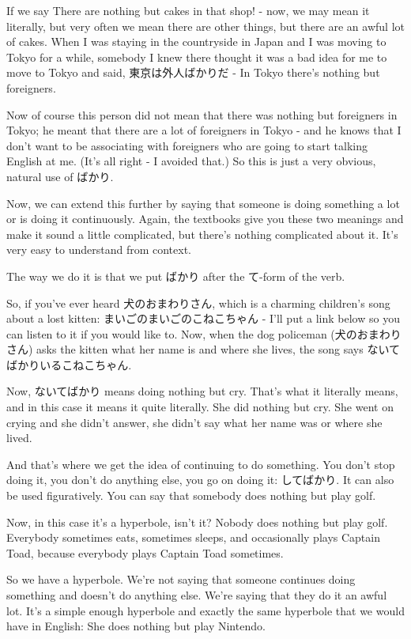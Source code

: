 If we say There are nothing but cakes in that shop! - now, we may mean it literally, but very often we mean there are other things, but there are an awful lot of cakes. When I was staying in the countryside in Japan and I was moving to Tokyo for a while, somebody I knew there thought it was a bad idea for me to move to Tokyo and said, 東京は外人ばかりだ - In Tokyo there's nothing but foreigners.

Now of course this person did not mean that there was nothing but foreigners in Tokyo; he meant that there are a lot of foreigners in Tokyo - and he knows that I don't want to be associating with foreigners who are going to start talking English at me. (It's all right - I avoided that.) So this is just a very obvious, natural use of ばかり.

Now, we can extend this further by saying that someone is doing something a lot or is doing it continuously. Again, the textbooks give you these two meanings and make it sound a little complicated, but there's nothing complicated about it. It's very easy to understand from context.

The way we do it is that we put ばかり after the て-form of the verb.

{}

So, if you've ever heard 犬のおまわりさん, which is a charming children's song about a lost kitten: まいごのまいごのこねこちゃん - I'll put a link below so you can listen to it if you would like to. Now, when the dog policeman (犬のおまわりさん) asks the kitten what her name is and where she lives, the song says ないてばかりいるこねこちゃん.

Now, ないてばかり means doing nothing but cry. That's what it literally means, and in this case it means it quite literally. She did nothing but cry. She went on crying and she didn't answer, she didn't say what her name was or where she lived.

And that's where we get the idea of continuing to do something. You don't stop doing it, you don't do anything else, you go on doing it: してばかり. It can also be used figuratively. You can say that somebody does nothing but play golf.

Now, in this case it's a hyperbole, isn't it? Nobody does nothing but play golf. Everybody sometimes eats, sometimes sleeps, and occasionally plays Captain Toad, because everybody plays Captain Toad sometimes.

So we have a hyperbole. We're not saying that someone continues doing something and doesn't do anything else. We're saying that they do it an awful lot. It's a simple enough hyperbole and exactly the same hyperbole that we would have in English: She does nothing but play Nintendo.

